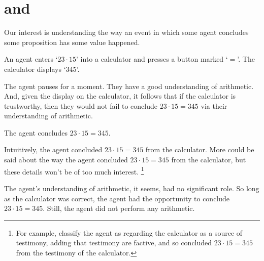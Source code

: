 \chapter{\qWhy{} and \qHow{}}
\label{cha:intro}

\begin{note}
  Our interest is understanding the way an event in which some agent concludes some proposition has some value happened.

  \begin{scenario}[Multiplication]%
    \label{illu:gist:calc}%
    An agent enters `\(23 \cdot 15\)' into a calculator and presses a button marked `\(=\)'.
    The calculator displays `\(345\)'.

    The agent pauses for a moment.
    They have a good understanding of arithmetic.
    And, given the display on the calculator, it follows that if the calculator is trustworthy, then they would not fail to conclude \(23 \cdot 15 = 345\) via their understanding of arithmetic.

    The agent concludes \(23 \cdot 15 = 345\).
  \end{scenario}

  Intuitively, the agent concluded \(23 \cdot 15 = 345\) from the calculator.
  More could be said about the way the agent concluded \(23 \cdot 15 = 345\) from the calculator, but these details won't be of too much interest.%
  \footnote{
    For example, classify the agent as regarding the calculator as a source of testimony, adding that testimony are factive, and so concluded \(23 \cdot 15 = 345\) from the testimony of the calculator.
  }

  The agent's understanding of arithmetic, it seems, had no significant role.
  So long as the calculator was correct, the agent had the opportunity to conclude \(23 \cdot 15 = 345\).
  Still, the agent did not perform any arithmetic.
\end{note}

